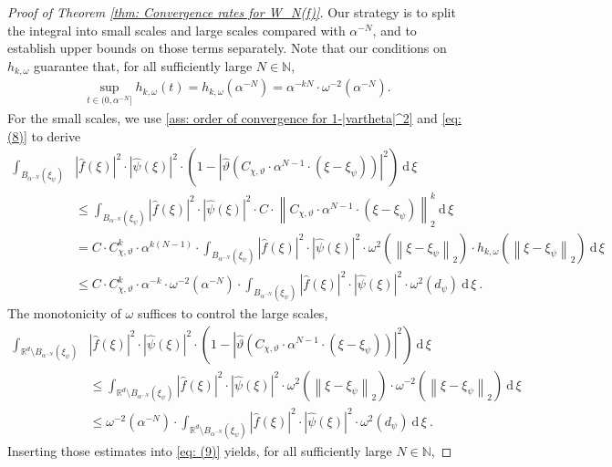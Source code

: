 \documentclass[11pt]{amsart}
\newcommand{\R}{{\mathbb{R}}}
\newcommand{\N}{\mathbb{N}}
\newcommand{\dxi}{\:\mathrm{d}\,\xi\:}
\newcommand{\abs}[1]{\ensuremath{\left|\text{}#1\text{}\right|}}
\newcommand{\norm}[1]{\ensuremath{\left\lVert\text{}#1\text{}\right\rVert}}
\newenvironment{proof sketch} {\textit{Proof sketch.}}{}
\begin{document}
\begin{proof}[Proof of Theorem \ref{thm: Convergence rates for W_N(f)}]
    Our strategy is to split the integral into small scales and large scales compared with $\alpha^{-N}$, and to establish upper bounds on those terms separately. Note that our conditions on $h_{k,\omega}$ guarantee that, for all sufficiently large $N \in \N$, 
    \begin{align}\label{eq: (8)}
      \sup_{t \in (0,\alpha^{-N}]} h_{k,\omega}(t)= h_{k,\omega}(\alpha^{-N})=\alpha^{-kN}\cdot \omega^{-2}(\alpha^{-N}).
    \end{align}
    For the small scales, we use \eqref{ass: order of convergence for 1-|vartheta|^2} and \eqref{eq: (8)} to derive
    \begin{align*}
      \int_{B_{\alpha^{-N}}(\xi_\psi)} &|\widehat{f}(\xi)|^2 \cdot |\widehat{\psi}(\xi)|^2 \cdot \left(1-\abs{\widehat{\vartheta}\left(C_{\chi,\vartheta}\cdot \alpha^{N-1}\cdot (\xi-\xi_\psi)\right)}^2\right) \dxi\\
      &\leq \int_{B_{\alpha^{-N}}(\xi_\psi)} |\widehat{f}(\xi)|^2 \cdot |\widehat{\psi}(\xi)|^2 \cdot C \cdot \norm{C_{\chi,\vartheta} \cdot \alpha^{N-1} \cdot (\xi-\xi_\psi)}_2^k \dxi \\
      &= C \cdot C_{\chi,\vartheta}^k \cdot  \alpha^{k(N-1)} \cdot \int_{B_{\alpha^{-N}}(\xi_\psi)} |\widehat{f}(\xi)|^2 \cdot |\widehat{\psi}(\xi)|^2 \cdot \omega^{2}(\norm{\xi-\xi_\psi}_2) \cdot h_{k,\omega}(\norm{\xi-\xi_\psi}_2) \dxi \\
      &\leq C \cdot C_{\chi,\vartheta}^k \cdot \alpha^{-k} \cdot \omega^{-2}(\alpha^{-N}) \cdot \int_{B_{\alpha^{-N}}(\xi_\psi)} |\widehat{f}(\xi)|^2 \cdot |\widehat{\psi}(\xi)|^2 \cdot \omega^{2}(d_\psi) \dxi.
    \end{align*}
    The monotonicity of $\omega$ suffices to control the large scales,
    \begin{align*}
      \int_{\R^d\setminus B_{\alpha^{-N}}(\xi_\psi)} &|\widehat{f}(\xi)|^2 \cdot |\widehat{\psi}(\xi)|^2 \cdot \left(1-\abs{\widehat{\vartheta}\left(C_{\chi,\vartheta}\cdot \alpha^{N-1}\cdot (\xi-\xi_\psi)\right)}^2\right) \dxi \\
      &\leq \int_{\R^d\setminus B_{\alpha^{-N}}(\xi_\psi)} |\widehat{f}(\xi)|^2 \cdot |\widehat{\psi}(\xi)|^2 \cdot \omega^{2}(\norm{\xi-\xi_\psi}_2) \cdot \omega^{-2}(\norm{\xi-\xi_\psi}_2) \dxi \\
      &\leq \omega^{-2}(\alpha^{-N}) \cdot \int_{\R^d\setminus B_{\alpha^{-N}}(\xi_\psi)} |\widehat{f}(\xi)|^2 \cdot |\widehat{\psi}(\xi)|^2 \cdot \omega^{2}(d_\psi) \dxi.
    \end{align*}
    Inserting those estimates into \eqref{eq: (9)} yields, for all sufficiently large $N \in \N$, 

\end{proof}
\end{document}
